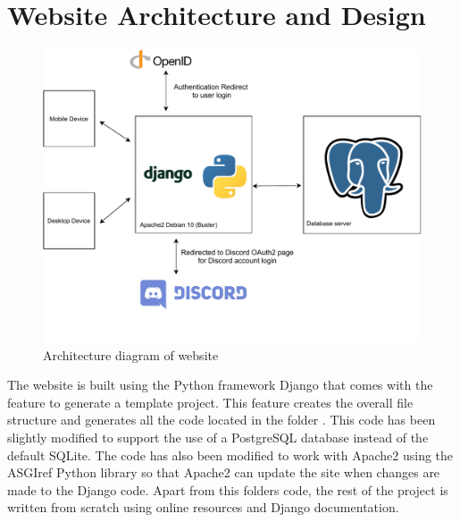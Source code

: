 
\section{Website Architecture and Design}
\begin{figure}[H]
	\centering
	\includegraphics[width=1\linewidth]{Figures/Architecture-website}
	\caption{Architecture diagram of website}
	\label{fig:architecture-web}
\end{figure}

The website is built using the Python framework Django \cite{Django} that comes with the feature to generate a template project. This feature creates the overall file structure and generates all the code located in the folder . This code has been slightly modified to support the use of a PostgreSQL \cite{psql} database instead of the default SQLite. The code has also been modified to work with Apache2 \cite{apache2} using the ASGIref \cite{asgiref} Python library so that Apache2 can update the site when changes are made to the Django code. Apart from this folders code, the rest of the project is written from scratch using online resources and Django documentation.

